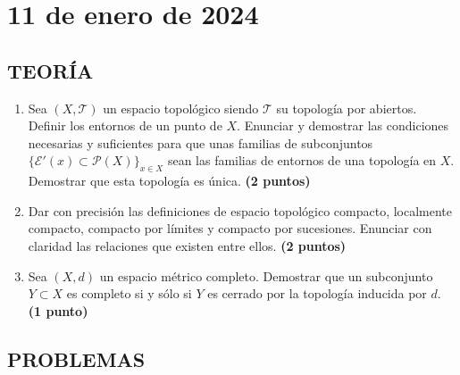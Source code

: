 \newpage

\section{11 de enero de 2024}

\subsection*{TEORÍA}

\begin{enumerate}
    \item Sea $(X, \mathcal{T})$ un espacio topológico siendo $\mathcal{T}$ su topología por abiertos. Definir los entornos de un punto de $X$. Enunciar y demostrar las condiciones necesarias y suficientes para que unas familias de subconjuntos $\{\mathcal{E}'(x) \subset \mathcal{P}(X)\}_{x \in X}$ sean las familias de entornos de una topología en $X$. Demostrar que esta topología es única.
    \hfill \textbf{(2 puntos)}

    \item Dar con precisión las definiciones de espacio topológico compacto, localmente compacto, compacto por límites y compacto por sucesiones. Enunciar con claridad las relaciones que existen entre ellos.
    \hfill \textbf{(2 puntos)}

    \item Sea $(X, d)$ un espacio métrico completo. Demostrar que un subconjunto $Y \subset X$ es completo si y sólo si $Y$ es cerrado por la topología inducida por $d$.
    \hfill \textbf{(1 punto)}
\end{enumerate}

\subsection*{PROBLEMAS}

